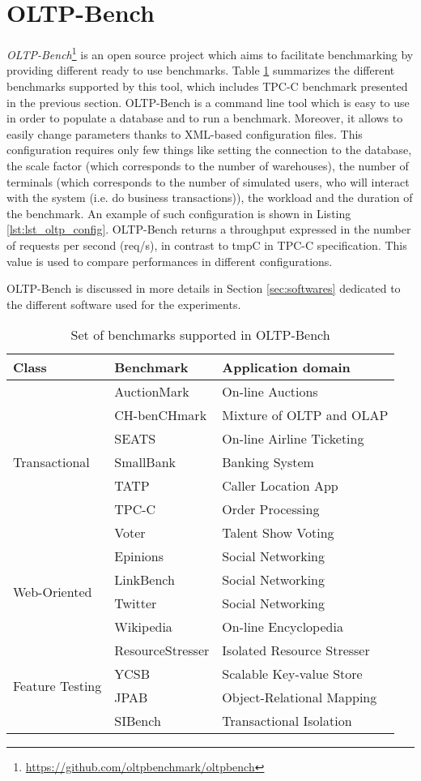 \section{OLTP-Bench}
\textit{OLTP-Bench}\footnote{\url{https://github.com/oltpbenchmark/oltpbench}} is an open source project which aims to facilitate benchmarking by providing different ready to use benchmarks. 
Table \ref{table:oltpbench_list} summarizes the different benchmarks supported by this tool, which includes TPC-C benchmark presented in the previous section.
OLTP-Bench is a command line tool which is easy to use in order to populate a database and to run a benchmark.
Moreover, it allows to easily change parameters thanks to XML-based configuration files.
This configuration requires only few things like setting the connection to the database, the scale factor (which corresponds to the number of warehouses), the number of terminals (which corresponds to the number of simulated users, who will interact with the system (i.e. do business transactions)), the workload and the duration of the benchmark.
An example of such configuration is shown in Listing \ref{lst:lst_oltp_config}.
OLTP-Bench returns a throughput expressed in the number of requests per second (req/s), in contrast to tmpC in TPC-C specification.
This value is used to compare performances in different configurations.

OLTP-Bench is discussed in more details in Section \ref{sec:softwares} dedicated to the different software used for the experiments.

\begin{table}[h]
	\centering
	\begin{tabular}{|m{3.5cm}|m{3.5cm}|m{6cm}|}
		\hline
		\textbf{Class} & \textbf{Benchmark} & \textbf{Application domain}\\
		\hline
		\multirow{7}{*}{Transactional} & AuctionMark & On-line Auctions\\
		 & CH-benCHmark & Mixture of OLTP and OLAP\\
		 & SEATS & On-line Airline Ticketing\\
		 & SmallBank & Banking System\\
		 & TATP & Caller Location App\\
		 & TPC-C & Order Processing\\
		 & Voter & Talent Show Voting\\
		\hline
		\multirow{4}{*}{Web-Oriented} & Epinions & Social Networking\\
		 & LinkBench & Social Networking\\
		 & Twitter & Social Networking\\
		 & Wikipedia & On-line Encyclopedia\\
		\hline
		\multirow{4}{*}{Feature Testing} & ResourceStresser & Isolated Resource Stresser\\
		 & YCSB & Scalable Key-value Store\\
		 & JPAB & Object-Relational Mapping\\
		 & SIBench & Transactional Isolation\\
		\hline
	\end{tabular}
	\caption{Set of benchmarks supported in OLTP-Bench \cite{difallah14}}
	\label{table:oltpbench_list}
\end{table}
